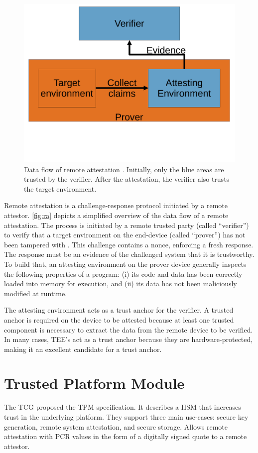 \begin{figure}
  \centering
  \includegraphics[trim={0 5cm 0 0}, width=0.5\linewidth]{figures/remote_attestation.pdf}
  \caption{Data flow of remote attestation \cite{rfc9334}. Initially, only the blue areas are trusted by the verifier. After the attestation, the verifier also trusts the target environment.} \label{fig:ra}
\end{figure}

Remote attestation is a challenge-response protocol initiated by a remote attestor. \autoref{fig:ra} depicts a simplified overview of the data flow of a remote attestation.
The process is initiated by a remote trusted party (called ``verifier'') to verify that a target environment on the end-device (called ``prover'') has not been tampered with \cite{Menetrey2022, Coker2011}. This challenge contains a nonce, enforcing a fresh response.
The response must be an evidence of the challenged system that it is trustworthy. To build that, an attesting environment on the prover device generally inspects the following properties of a program: (i) its code and data has been correctly loaded into memory for execution, and (ii) its data has not been maliciously modified at runtime.

The attesting environment acts as a trust anchor for the verifier.
A trusted anchor is required on the device to be attested because at least one trusted component is necessary to extract the data from the remote device to be verified. In many cases, TEE's act as a trust anchor because they are hardware-protected, making it an excellent candidate for a trust anchor.

\section{Trusted Platform Module}

The \ac{TCG} proposed the TPM specification. It describes a \ac{HSM} that increases trust in the underlying platform.
They support three main use-cases: secure key generation, remote system attestation, and secure storage. 
Allows remote attestation with \ac{PCR} values in the form of a digitally signed quote to a remote attestor.

